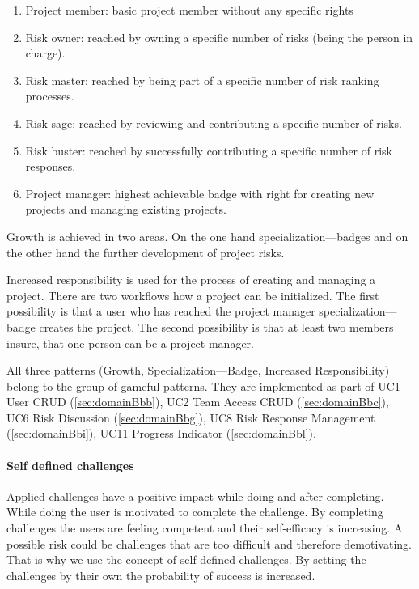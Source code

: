 \begin{enumerate}
	\item Project member: basic project member without any specific rights
	\item Risk owner: reached by owning a specific number of risks (being the person in charge).
	\item Risk master: reached by being part of a specific number of risk ranking processes.
	\item Risk sage: reached by reviewing and contributing a specific number of risks.
	\item Risk buster: reached by successfully contributing a specific number of risk responses.
	\item Project manager: highest achievable badge with right for creating new projects and managing existing projects.
\end{enumerate}

Growth is achieved in two areas. On the one hand specialization—badges and on the other hand the further development of project risks.

Increased responsibility is used for the process of creating and managing a project. There are two workflows how a project can be initialized. The first possibility is that a user who has reached the project manager specialization—badge creates the project. The second possibility is that at least two members insure, that one person can be a project manager.

All three patterns (Growth, Specialization—Badge, Increased Responsibility) belong to the group of gameful patterns.
They are implemented as part of \ac{UC}1 User CRUD (\ref{sec:domainBbb}), \ac{UC}2 Team Access CRUD (\ref{sec:domainBbc}), \ac{UC}6 Risk Discussion (\ref{sec:domainBbg}), \ac{UC}8 Risk Response Management (\ref{sec:domainBbi}), \ac{UC}11 Progress Indicator (\ref{sec:domainBbl}).

\paragraph*{Self defined challenges}

Applied challenges have a positive impact while doing and after completing. While doing the user is motivated to complete the challenge. By completing challenges the users are feeling competent and their self-efficacy is increasing. A possible risk could be challenges that are too difficult and therefore demotivating. That is why we use the concept of self defined challenges. By setting the challenges by their own the probability of success is increased.

